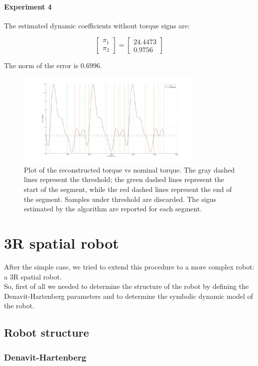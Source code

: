 \documentclass{article}
\begin{document}
\paragraph{Experiment 4} The estimated dynamic coefficients without torque signs are:

\[\begin{bmatrix}
\pi_1  \\ \pi_2 
\end{bmatrix}=\begin{bmatrix}
24.4473 \\ 0.9756
\end{bmatrix}\]

The norm of the error is 0.6996.
\begin{figure}[!htbp]
\centering
\includegraphics[width=0.8\textwidth]{images/1-dof/results_new_experiment4.png}
\caption{Plot of the reconstructed torque vs nominal torque. The gray dashed lines represent the threshold; the green dashed lines represent the start of the segment, while the red dashed lines represent the end of the segment. Samples under threshold are discarded. The signs estimated by the algorithm are reported for each segment.}
\end{figure}
\FloatBarrier
\section{3R spatial robot}
After the simple case, we tried to extend this procedure to a more complex robot: a 3R spatial robot.\\
So, first of all we needed to determine the structure of the robot by defining the Denavit-Hartenberg parameters and to determine the symbolic dynamic model of the robot.
\subsection{Robot structure}
\subsubsection*{Denavit-Hartenberg}
\end{document}
